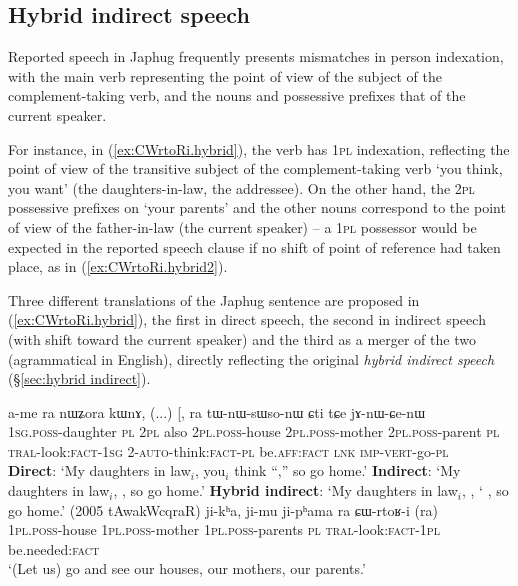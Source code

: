   
\subsection{Hybrid indirect speech} \label{sec:hybrid.intro}
Reported speech in Japhug frequently presents mismatches in person indexation, with the main verb representing the point of view of the subject of the com\-ple\-ment-taking verb, and the nouns and possessive prefixes that of the current speaker.
 
For instance, in (\ref{ex:CWrtoRi.hybrid}), the verb  has \textsc{1pl} indexation, reflecting the point of view of the transitive subject of the com\-ple\-ment-taking verb  `you think, you want' (the daughters-in-law, the addressee). On the other hand, the \textsc{2pl} possessive prefixes on  `your parents' and the other nouns correspond to the point of view of the father-in-law (the current speaker) -- a \textsc{1pl} possessor would be expected in the reported speech clause if no shift of point of reference had taken place, as in  (\ref{ex:CWrtoRi.hybrid2}).

Three different translations of the Japhug sentence are proposed in (\ref{ex:CWrtoRi.hybrid}), the first in direct speech, the second in indirect speech (with shift toward the current speaker) and the third as a merger of the two (agrammatical in English), directly reflecting the original \textit{hybrid indirect speech} (§\ref{sec:hybrid indirect}).

\begin{exe}
\ex 
\begin{xlist}
\ex \label{ex:CWrtoRi.hybrid}
\gll  a-me ra nɯʑora kɯnɤ, (...) [,   ra \bleu{ɕɯ-rtoʁ-i]} tɯ-nɯ-sɯso-nɯ ɕti tɕe jɤ-nɯ-ɕe-nɯ   \\
\textsc{1sg}.\textsc{poss}-daughter \textsc{pl} \textsc{2pl} also {  } \textsc{2pl}.\textsc{poss}-house \textsc{2pl}.\textsc{poss}-mother  \textsc{2pl}.\textsc{poss}-parent \textsc{pl} \textsc{tral}-look:\textsc{fact}-\textsc{1sg} 2-\textsc{auto}-think:\textsc{fact}-\textsc{pl} be.\textsc{aff}:\textsc{fact} \textsc{lnk} \textsc{imp}-\textsc{vert}-go-\textsc{pl} \\ 
\glt  \textbf{Direct}: `My daughters in law$_i$, you$_i$ think ``,'' so go home.' 
\glt  \textbf{Indirect}:   `My daughters in law$_i$, , so go home.'
\glt  \textbf{Hybrid indirect}: `My daughters in law$_i$, , ` , so go home.' (2005 tAwakWcqraR)
\ex \label{ex:CWrtoRi.hybrid2}
\gll ji-kʰa, ji-mu ji-pʰama ra ɕɯ-rtoʁ-i (ra)\\
\textsc{1pl}.\textsc{poss}-house \textsc{1pl}.\textsc{poss}-mother \textsc{1pl}.\textsc{poss}-parents \textsc{pl} \textsc{tral}-look:\textsc{fact}-\textsc{1pl} be.needed:\textsc{fact} \\
\glt `(Let us) go and see our houses, our mothers, our parents.' 
\end{xlist}
\end{exe}

